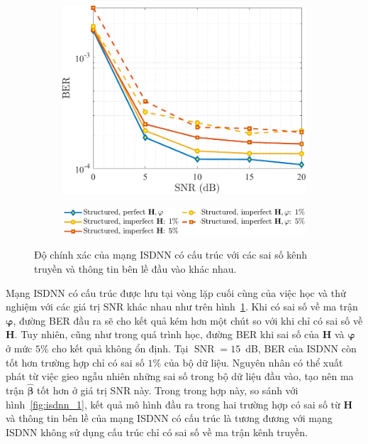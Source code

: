 \begin{figure}[ht]
    \centering
    \begin{subfigure}{\linewidth}
        \includegraphics[width=\linewidth]{figures/performance_3.pdf}
    \end{subfigure}
    \hfill
    \begin{subfigure}{\linewidth}
        \centering
        \includegraphics[width=.8\linewidth]{figures/lg_performance_31.pdf}
    \end{subfigure}
    \caption{Độ chính xác của mạng ISDNN có cấu trúc với các sai số kênh truyền và thông tin bên lề đầu vào khác nhau.}
    \label{fig:isdnn_3}
\end{figure}

Mạng ISDNN có cấu trúc được lưu tại vòng lặp cuối cùng của việc học và thử nghiệm với các giá trị SNR khác nhau như trên hình~\ref{fig:isdnn_3}. Khi có sai số về ma trận $\boldsymbol{\varphi}$, đường BER đầu ra sẽ cho kết quả kém hơn một chút so với khi chỉ có sai số về $\mathbf{H}$. Tuy nhiên, cũng như trong quá trình học, đường BER khi sai số của $\mathbf{H}$ và $\boldsymbol{\varphi}$ ở mức $5\%$ cho kết quả không ổn định. Tại $\operatorname{SNR}=15$~dB, BER của ISDNN còn tốt hơn trường hợp chỉ có sai số $1\%$ của bộ dữ liệu. Nguyên nhân có thể xuất phát từ việc gieo ngẫu nhiên những sai số trong bộ dữ liệu đầu vào, tạo nên ma trận $\hat{\boldsymbol{\beta}}$ tốt hơn ở giá trị SNR này. Trong trong hợp này, so sánh với hình~\ref{fig:isdnn_1}, kết quả mô hình đầu ra trong hai trường hợp có sai số từ $\mathbf{H}$ và thông tin bên lề của mạng ISDNN có cấu trúc là tương đương với mạng ISDNN không sử dụng cấu trúc chỉ có sai số về ma trận kênh truyền.
